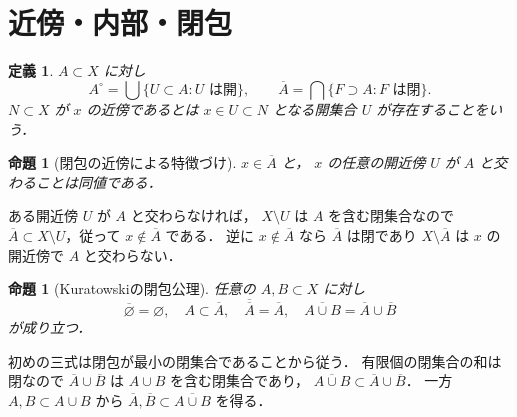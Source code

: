 \documentclass[a5paper,10pt,onecolumn]{jsarticle}
\makeatletter
\theoremstyle{mathnotetheorem}
\newtheorem{definition}[theorem]{定義}
\newtheorem{proposition}[theorem]{命題}
\renewcommand{\proofname}{証明}
\renewenvironment{proof}[1][\proofname]{%
  \par\pushQED{\qed}\normalfont\topsep4\p@\@plus2\p@\relax
  \trivlist\item[\hskip\labelsep\bfseries #1]\ignorespaces
}{\popQED\endtrivlist\@endpefalse}
\makeatother
\begin{document}
\section{近傍・内部・閉包}
\begin{definition}
$A\subset X$ に対し
\[
 A^\circ=\bigcup\{U\subset A:U\text{ は開}\},\qquad
 \overline A=\bigcap\{F\supset A:F\text{ は閉}\}.
\]
$N\subset X$ が $x$ の近傍であるとは
$x\in U\subset N$ となる開集合 $U$ が存在することをいう．
\end{definition}
\begin{proposition}[閉包の近傍による特徴づけ]\label{prop:closure}
$x\in\overline A$ と，
$x$ の任意の開近傍 $U$ が $A$ と交わることは同値である．
\end{proposition}
\begin{proof}
ある開近傍 $U$ が $A$ と交わらなければ，
$X\setminus U$ は $A$ を含む閉集合なので
$\overline A\subset X\setminus U$，従って
$x\notin\overline A$ である．
逆に $x\notin\overline A$ なら
$\overline A$ は閉であり
$X\setminus\overline A$ は $x$ の開近傍で
$A$ と交わらない．
\end{proof}
\begin{proposition}[Kuratowskiの閉包公理]
任意の $A,B\subset X$ に対し
\[
 \overline\varnothing=\varnothing,\quad
 A\subset\overline A,\quad
 \overline{\overline A}=\overline A,\quad
 \overline{A\cup B}=\overline A\cup\overline B
\]
が成り立つ．
\end{proposition}
\begin{proof}
初めの三式は閉包が最小の閉集合であることから従う．
有限個の閉集合の和は閉なので
$\overline A\cup\overline B$ は $A\cup B$ を含む閉集合であり，
$\overline{A\cup B}\subset\overline A\cup\overline B$．
一方 $A,B\subset A\cup B$ から
$\overline A,\overline B\subset\overline{A\cup B}$ を得る．
\end{proof}
\end{document}
